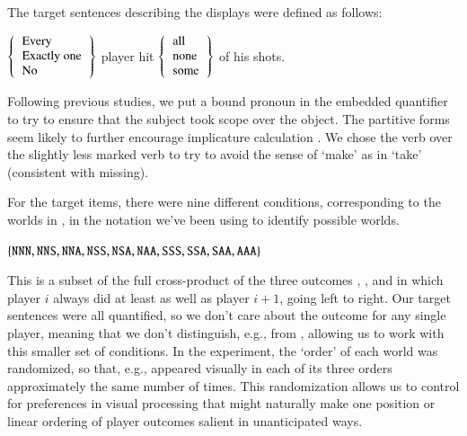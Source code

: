 \documentclass[leqno,12pt]{article}
\begin{document}
The target sentences describing the displays were defined as follows:
%
\begin{examples}
\item\label{expmsgs} 
  $\set{
      \begin{tabular}[c]{l}
        Every \\
        Exactly one \\
        No 
      \end{tabular}}$
    player hit 
    $\set{
      \begin{tabular}[c]{l}
        all \\
        none \\
        some 
      \end{tabular}}$
    of his shots.  
\end{examples}
%
Following previous studies, we put a bound pronoun in the embedded
quantifier to try to ensure that the subject took scope over the
object. The partitive forms seem likely to further encourage
implicature calculation
\citep{reed:1991-interpreting,Grodner-etal:2010,degen:inpress-SP}. We
chose the verb  over the slightly less marked verb
 to try to avoid the sense of `make' as in `take'
(consistent with missing).

For the target items, there were nine different conditions,
corresponding to the worlds in , in the notation we've been
using to identify possible worlds.
%
\begin{examples}
\item\label{conds} $\left\{ \texttt{NNN}, \texttt{NNS}, \texttt{NNA},
    \texttt{NSS}, \texttt{NSA}, \texttt{NAA}, \texttt{SSS}, \texttt{SSA},
    \texttt{SAA}, \texttt{AAA} \right\}$
\end{examples}
%
%
This is a subset of the full cross-product of the three outcomes
, , and  in which player $i$ always did at
least as well as player $i+1$, going left to right.  Our target
sentences were all quantified, so we don't care about the outcome for
any single player, meaning that we don't distinguish, e.g.,
 from , allowing us to work with this smaller
set of conditions. In the experiment, the `order' of each world was
randomized, so that, e.g.,  appeared visually in each of
its three orders approximately the same number of times. This
randomization allows us to control for preferences in visual
processing that might naturally make one position or linear ordering
of player outcomes salient in unanticipated ways.
\end{document}

